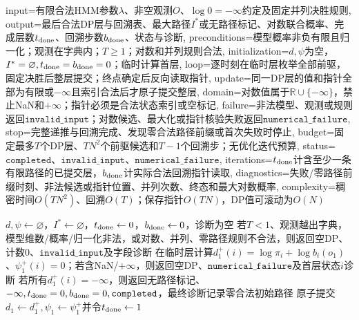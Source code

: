 \begin{AlgorithmContract}{
  input={有限合法HMM参数$\lambda$、非空观测$O$、$\log0=-\infty$约定及固定并列决胜规则},
  output={最后合法DP层与回溯表、最大路径$I^*$或无路径标记、对数联合概率、完成层数$t_{\rm done}$、回溯步数$b_{\rm done}$、状态与诊断},
  preconditions={模型概率非负有限且归一化；观测在字典内；$T\ge1$；对数和并列规则合法},
  initialization={$d,\psi$为空，$I^*=\varnothing,t_{\rm done}=b_{\rm done}=0$；临时计算首层},
  loop={逐时刻在临时层枚举全部前驱，固定决胜后整层提交；终点确定后反向读取指针},
  update={同一DP层的值和指针全部为有限或$-\infty$且索引合法后才原子提交整层},
  domain={对数值属于$\mathbb R\cup\{-\infty\}$，禁止NaN和$+\infty$；指针必须是合法状态索引或空标记},
  failure={非法模型、观测或规则返回$\mathtt{invalid\_input}$；对数候选、最大化或指针核验失败返回$\mathtt{numerical\_failure}$},
  stop={完整递推与回溯完成、发现零合法路径前缀或首次失败时停止},
  budget={固定最多$T$个DP层、$TN^2$个前驱候选和$T-1$个回溯步；无优化迭代预算},
  status={$\mathtt{completed}$、$\mathtt{invalid\_input}$、$\mathtt{numerical\_failure}$},
  iterations={$t_{\rm done}$计含至少一条有限路径的已提交层，$b_{\rm done}$计实际合法回溯指针读取},
  diagnostics={失败/零路径前缀时刻、非法候选或指针位置、并列次数、终态和最大对数概率},
  complexity={稠密时间$O(TN^2)$、回溯$O(T)$；保存指针$O(TN)$，DP值可滚动为$O(N)$}
}
\begin{algorithm}[H]
\caption{对数域Viterbi算法}\label{alg:V3-C05-viterbi}
$d,\psi\leftarrow\varnothing$，$I^*\leftarrow\varnothing$，$t_{\rm done}\leftarrow0$，$b_{\rm done}\leftarrow0$，诊断为空\;
若$T<1$、观测越出字典，模型维数/概率/归一化非法，或对数、并列、零路径规则不合法，则返回空DP、计数$0$、$\mathtt{invalid\_input}$及字段诊断\;
在临时层计算$d_1^+(i)=\log\pi_i+\log b_i(o_1)$、$\psi_1^+(i)=0$；若含NaN/$+\infty$，则返回空DP、$\mathtt{numerical\_failure}$及首层状态$i$诊断\;
若所有$d_1^+(i)=-\infty$，则返回无路径标记、$-\infty,t_{\rm done}=0,b_{\rm done}=0,\mathtt{completed}$，最终诊断记录零合法初始路径\;
原子提交$d_1\leftarrow d_1^+,\psi_1\leftarrow\psi_1^+$并令$t_{\rm done}\leftarrow1$\;
\end{algorithm}
\end{AlgorithmContract}
